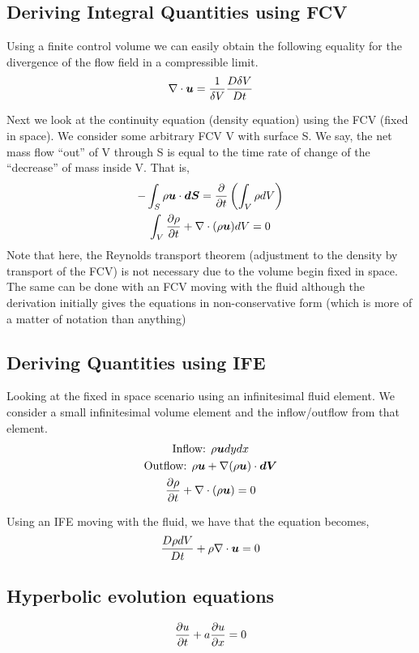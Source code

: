 \documentclass{article}
\begin{document}
\maketitle 

\tableofcontents

\setlength{\parindent}{0pt}
\setcounter{section}{1}

\pagebreak

\section{}

\subsection{Deriving Integral Quantities using FCV}

Using a finite control volume we can easily
obtain the following equality for the divergence of the flow field in a
compressible limit. 
\begin{gather*}
    \nabla \cdot{\boldsymbol{u}} = \frac{1}{\delta V} \frac{D \delta V}{D t}
\end{gather*}

Next we look at the continuity equation (density equation) using the FCV
(fixed in space). We consider some arbitrary FCV V with surface S. We say, the
net mass flow ``out'' of V through S is equal to the time rate of change
of the ``decrease'' of mass inside V. That is, 
\begin{gather*}
    -\int_S \rho\boldsymbol{u} \cdot \boldsymbol{dS} = \frac{\partial }{\partial t}\left( \int_V \rho dV\right)\\
    \int_V \frac{\partial \rho}{\partial t} + \nabla \cdot(\rho\boldsymbol{u}) dV = 0 
\end{gather*}
Note that here, the Reynolds transport theorem (adjustment to the density by
transport of the FCV) is not necessary due to the volume begin fixed in space. 
The same can be done with an FCV moving with the fluid although the derivation
initially gives the equations in non-conservative form (which is more of a
matter of notation than anything) 

\subsection{Deriving Quantities using IFE}
Looking at the fixed in space scenario using an infinitesimal fluid element. We consider a small
infinitesimal volume element and the inflow/outflow from that element. 
\begin{gather*}
    \text{Inflow: } \rho\boldsymbol{u} dydx\\
    \text{Outflow: } \rho\boldsymbol{u} + \nabla(\rho\boldsymbol{u})\cdot \boldsymbol{dV}\\
    \frac{\partial \rho}{\partial t} + \nabla\cdot(\rho\boldsymbol{u}) = 0
\end{gather*}

Using an IFE moving with the fluid, we have that the equation becomes, 
\begin{gather*}
    \frac{D \rho dV}{D t} + \rho\nabla \cdot{\boldsymbol{u}} = 0 
\end{gather*}

\subsection{Hyperbolic evolution equations}

\begin{gather*}
    \frac{\partial u}{\partial t} + a\frac{\partial u}{\partial x} = 0
\end{gather*}
\end{document}
